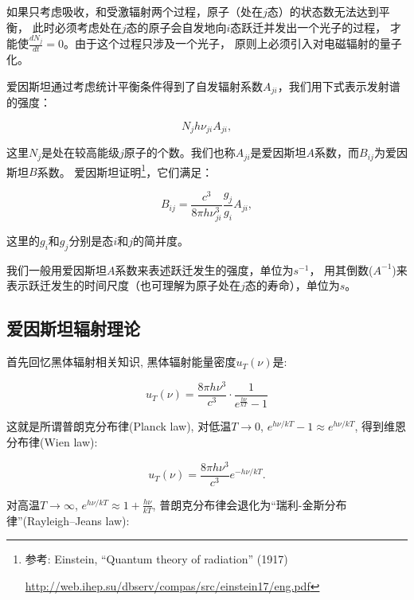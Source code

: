 如果只考虑吸收，和受激辐射两个过程，原子（处在$j$态）的状态数无法达到平衡，
此时必须考虑处在$j$态的原子会自发地向$i$态跃迁并发出一个光子的过程，
才能使$\frac{dN_j}{dt} = 0$。由于这个过程只涉及一个光子，
原则上必须引入对电磁辐射的量子化。

爱因斯坦通过考虑统计平衡条件得到了自发辐射系数$A_{ji}$，我们用下式表示发射谱的强度：

\begin{equation}\label{Emission}
    N_j h \nu_{ji} A_{ji},
\end{equation}

这里$N_j$是处在较高能级$j$原子的个数。我们也称$A_{ji}$是爱因斯坦$A$系数，而$B_{ij}$为爱因斯坦$B$系数。
爱因斯坦证明\footnote{参考: Einstein, ``Quantum theory of
radiation'' (1917)


\url{http://web.ihep.su/dbserv/compas/src/einstein17/eng.pdf}}，它们满足：

\begin{equation}\label{AB coefficients}
    B_{ij}= \frac{c^3}{8 \pi h \nu_{ji}^3} \frac{g_j}{g_i} A_{ji},
\end{equation}

这里的$g_i$和$g_j$分别是态$i$和$j$的简并度。

我们一般用爱因斯坦$A$系数来表述跃迁发生的强度，单位为$s^{-1}$，
用其倒数($A^{-1}$)来表示跃迁发生的时间尺度（也可理解为原子处在$j$态的寿命），单位为$s$。


\subsection{爱因斯坦辐射理论}

首先回忆黑体辐射相关知识, 黑体辐射能量密度$u_T(\nu)$是:

\begin{equation*}
u_T (\nu ) = \frac{{8\pi h\nu ^3 }}{{c^3 }} \cdot
\frac{1}{{e^{\frac{{h\nu }}{{k T}}}  - 1}}
\end{equation*}

这就是所谓普朗克分布律(Planck law), 对低温$T \to 0$, $e^{h\nu/kT} -
1 \approx e^{h\nu/kT}$, 得到维恩分布律(Wien law):

\begin{equation*}
u_T(\nu)=\frac{8 \pi h \nu^3}{c^3} e^{-h\nu/kT}.
\end{equation*}


对高温$T \to \infty$, $e^{h\nu/kT} \approx 1 + \frac{h\nu}{kT}$,
普朗克分布律会退化为``瑞利-金斯分布律''(Rayleigh–Jeans law):

